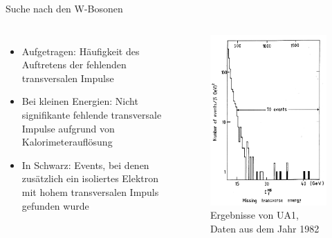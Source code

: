 \documentclass[aspectratio=1610, professionalfonts, 10pt]{beamer}
\begin{document}
\begin{frame}[plain]{Suche nach den W-Bosonen}
		\vspace*{-40px}
	\begin{columns}
			\begin{itemize}
				\setlength\itemsep{0.5em}
				\item Aufgetragen: Häufigkeit des Auftretens der fehlenden transversalen Impulse
				\item Bei kleinen Energien: Nicht signifikante fehlende transversale Impulse aufgrund von Kalorimeterauflösung
				\item In Schwarz: Events, bei denen zusätzlich ein isoliertes Elektron mit hohem transversalen Impuls gefunden wurde
			\end{itemize}
			\begin{figure}
	  			\centering
				\includegraphics[width=0.65\textheight]{Images/Screenshot_2018-12-04_18-09-05.png}
				\caption{Ergebnisse von UA1, Daten aus dem Jahr 1982 \cite{doi:10.1142/9789814644150_0006}}
	  			\label{fig:sad}
			\end{figure}
	\end{columns}
\end{frame}
\end{document}
